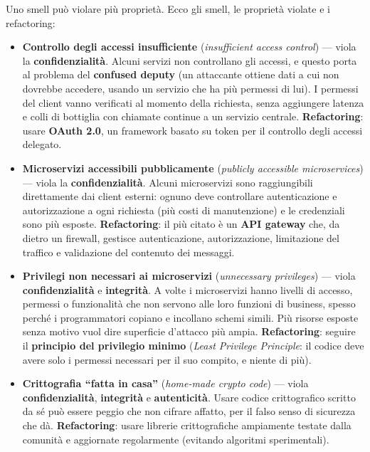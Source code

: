 Uno smell può violare più proprietà. Ecco gli smell, le proprietà
violate e i refactoring:

\begin{itemize}
\tightlist
\item
  \textbf{Controllo degli accessi insufficiente} (\emph{insufficient
  access control}) --- viola la \textbf{confidenzialità}. Alcuni servizi
  non controllano gli accessi, e questo porta al problema del
  \textbf{confused deputy} (un attaccante ottiene dati a cui non
  dovrebbe accedere, usando un servizio che ha più permessi di lui). I
  permessi del client vanno verificati al momento della richiesta, senza
  aggiungere latenza e colli di bottiglia con chiamate continue a un
  servizio centrale. \textbf{Refactoring}: usare \textbf{OAuth 2.0}, un
  framework basato su token per il controllo degli accessi delegato.
\item
  \textbf{Microservizi accessibili pubblicamente} (\emph{publicly
  accessible microservices}) --- viola la \textbf{confidenzialità}.
  Alcuni microservizi sono raggiungibili direttamente dai client
  esterni: ognuno deve controllare autenticazione e autorizzazione a
  ogni richiesta (più costi di manutenzione) e le credenziali sono più
  esposte. \textbf{Refactoring}: il più citato è un \textbf{API gateway}
  che, da dietro un firewall, gestisce autenticazione, autorizzazione,
  limitazione del traffico e validazione del contenuto dei messaggi.
\item
  \textbf{Privilegi non necessari ai microservizi} (\emph{unnecessary
  privileges}) --- viola \textbf{confidenzialità} e \textbf{integrità}.
  A volte i microservizi hanno livelli di accesso, permessi o
  funzionalità che non servono alle loro funzioni di business, spesso
  perché i programmatori copiano e incollano schemi simili. Più risorse
  esposte senza motivo vuol dire superficie d'attacco più ampia.
  \textbf{Refactoring}: seguire il \textbf{principio del privilegio
  minimo} (\emph{Least Privilege Principle}: il codice deve avere solo i
  permessi necessari per il suo compito, e niente di più).
\item
  \textbf{Crittografia ``fatta in casa''} (\emph{home-made crypto code})
  --- viola \textbf{confidenzialità}, \textbf{integrità} e
  \textbf{autenticità}. Usare codice crittografico scritto da sé può
  essere peggio che non cifrare affatto, per il falso senso di sicurezza
  che dà. \textbf{Refactoring}: usare librerie crittografiche ampiamente
  testate dalla comunità e aggiornate regolarmente (evitando algoritmi
  sperimentali).

\end{itemize}
